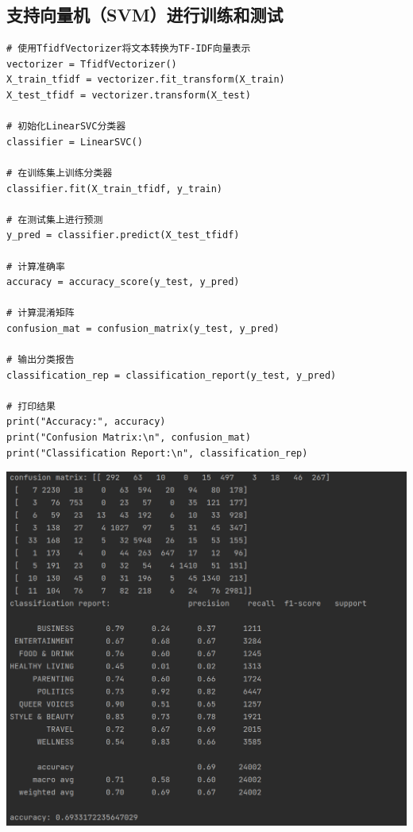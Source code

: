 \documentclass{article}
\begin{document}
\subsection{支持向量机（SVM）进行训练和测试}
\begin{lstlisting}
# 使用TfidfVectorizer将文本转换为TF-IDF向量表示
vectorizer = TfidfVectorizer()
X_train_tfidf = vectorizer.fit_transform(X_train)
X_test_tfidf = vectorizer.transform(X_test)

# 初始化LinearSVC分类器
classifier = LinearSVC()

# 在训练集上训练分类器
classifier.fit(X_train_tfidf, y_train)

# 在测试集上进行预测
y_pred = classifier.predict(X_test_tfidf)

# 计算准确率
accuracy = accuracy_score(y_test, y_pred)

# 计算混淆矩阵
confusion_mat = confusion_matrix(y_test, y_pred)

# 输出分类报告
classification_rep = classification_report(y_test, y_pred)

# 打印结果
print("Accuracy:", accuracy)
print("Confusion Matrix:\n", confusion_mat)
print("Classification Report:\n", classification_rep)
\end{lstlisting}
\begin{center}
    \includegraphics[width=1\linewidth]{2.png}
\end{center}
\end{document}
